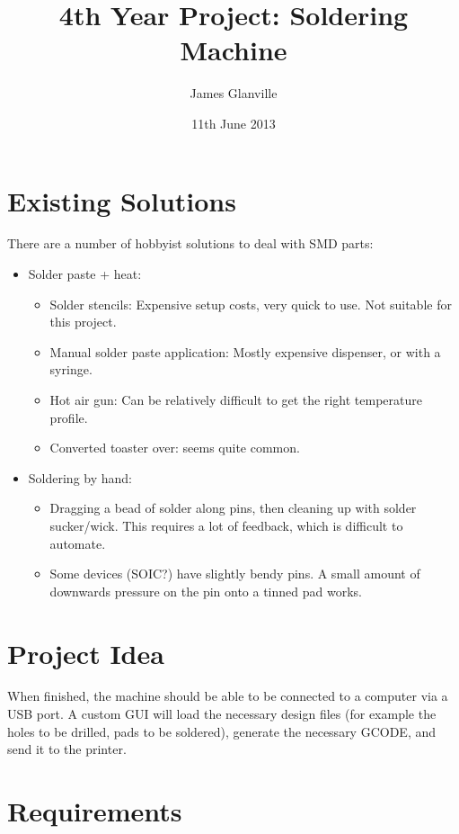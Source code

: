 \documentclass[a4paper,11pt]{article}  %
\title{4th Year Project: Soldering Machine}
\author{James Glanville}
\date{11th June 2013}
\begin{document}
\maketitle

\section{Existing Solutions}
There are a number of hobbyist solutions to deal with SMD parts:

\begin{itemize}
	\item	Solder paste + heat:
		\begin{itemize}
			\item	Solder stencils: Expensive setup costs, very quick to use. Not suitable for
				this project.
			\item	Manual solder paste application: Mostly expensive dispenser, or with a syringe.
			\item	Hot air gun: Can be relatively difficult to get the right temperature profile.
			\item	Converted toaster over: seems quite common.
		\end{itemize}

	\item	Soldering by hand:
		\begin{itemize}
			\item	Dragging a bead of solder along pins, then cleaning up with solder sucker/wick.
				This requires a lot of feedback, which is difficult to automate.
			\item	Some devices (SOIC?) have slightly bendy pins. A small amount of downwards 
				pressure on the pin onto a tinned pad works.
		\end{itemize}
\end{itemize}

\section{Project Idea}
When finished, the machine should be able to be connected to a computer via a USB port. A custom GUI will load the necessary 
design files (for example the holes to be drilled, pads to be soldered), generate the necessary GCODE, and send it to the printer.

\section{Requirements}
\end{document}
